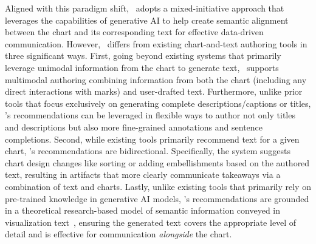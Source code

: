 Aligned with this paradigm shift, \pluto~adopts a mixed-initiative approach that leverages the capabilities of generative AI to help create semantic alignment between the chart and its corresponding text for effective data-driven communication.
However, \pluto~differs from existing chart-and-text authoring tools in three significant ways.
First, going beyond existing systems that primarily leverage unimodal information from the chart to generate text, \pluto~supports multimodal authoring combining information from both the chart (including any direct interactions with marks) and user-drafted text.
Furthermore, unlike prior tools that focus exclusively on generating complete descriptions/captions or titles, \pluto's recommendations can be leveraged in flexible ways to author not only titles and descriptions but also more fine-grained annotations and sentence completions. Second, while existing tools primarily recommend text for a given chart, \pluto's recommendations are bidirectional.
Specifically, the system suggests chart design changes like sorting or adding embellishments based on the authored text, resulting in artifacts that more clearly communicate takeaways via a combination of text and charts. Lastly, unlike existing tools that primarily rely on pre-trained knowledge in generative AI models, \pluto's recommendations are grounded in a theoretical research-based model of semantic information conveyed in visualization text~\cite{lundgard2021accessible}, ensuring the generated text covers the appropriate level of detail and is effective for communication \emph{alongside} the chart.